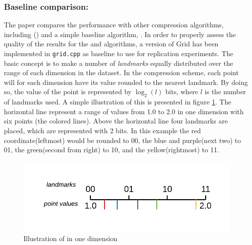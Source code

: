 \subsubsection{Baseline comparison: \gr{}}
\label{baseline}
The paper compares the \qs{} performance with other compression algorithms, including (\pq{}) and a simple baseline algorithm, \gr{}. In order to properly assess the quality of the results for the \qs{} and \qsr{} algorithms, a version of Grid has been implemented in \texttt{grid.cpp} as baseline to use for replication experiments. The basic concept is to make a number of \textit{landmarks} equally distributed over the range of each dimension in the dataset. In the compression scheme, each point will for each dimension have its value rounded to the nearest landmark. By doing so, the value of the point is represented by $\log_2(l)$ bits, where $l$ is the number of landmarks used. A simple illustration of this is presented in figure \ref{landmarks}. The horizontal line represent a range of values from 1.0 to 2.0 in one dimension with six points (the colored lines). Above the horizontal line four landmarks are placed, which are represented with 2 bits. In this example the red coordinate(leftmost) would be rounded to 00, the blue and purple(next two) to 01, the green(second from right) to 10, and the yellow(rightmost) to 11.

\begin{figure}[h]
	\centering
	\includegraphics[width=\textwidth]{figures/Landmarks.png}
	\caption{Illustration of \gr{} in one dimension}
	\label{landmarks}
\end{figure}

